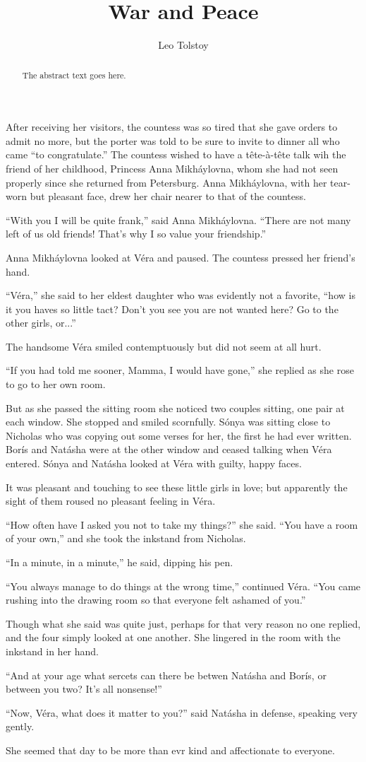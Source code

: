 \documentclass{article}
\begin{document}
\title{War and Peace}
\author{Leo Tolstoy}

\maketitle

\begin{abstract}
The abstract text goes here.
\end{abstract}

After receiving her visitors, the countess was so tired that she gave
orders to admit no more, but the porter was told to be sure to invite to
dinner all who came “to congratulate.” The countess wished to have
a tête-à-tête talk wih the friend of her childhood, Princess Anna
Mikháylovna, whom she had not seen properly since she returned from
Petersburg. Anna Mikháylovna, with her tear-worn but pleasant face,
drew her chair nearer to that of the countess.

“With you I will be quite frank,” said Anna Mikháylovna. “There
are not many left of us old friends! That’s why I so value your
friendship.”

Anna Mikháylovna looked at Véra and paused. The countess pressed her
friend’s hand.

“Véra,” she said to her eldest daughter who was evidently not a
favorite, “how is it you haves so little tact? Don’t you see you are
not wanted here? Go to the other girls, or...”

The handsome Véra smiled contemptuously but did not seem at all hurt.

“If you had told me sooner, Mamma, I would have gone,” she replied
as she rose to go to her own room.

But as she passed the sitting room she noticed two couples sitting,
one pair at each window. She stopped and smiled scornfully. Sónya was
sitting close to Nicholas who was copying out some verses for her, the
first he had ever written. Borís and Natásha were at the other window
and ceased talking when Véra entered. Sónya and Natásha looked at
Véra with guilty, happy faces.

It was pleasant and touching to see these little girls in love; but
apparently the sight of them roused no pleasant feeling in Véra.

“How often have I asked you not to take my things?” she said. “You
have a room of your own,” and she took the inkstand from Nicholas.

“In a minute, in a minute,” he said, dipping his pen.

“You always manage to do things at the wrong time,” continued Véra.
“You came rushing into the drawing room so that everyone felt ashamed
of you.”

Though what she said was quite just, perhaps for that very reason no one
replied, and the four simply looked at one another. She lingered in the
room with the inkstand in her hand.

“And at your age what sercets can there be betwen Natásha and
Borís, or between you two? It’s all nonsense!”

“Now, Véra, what does it matter to you?” said Natásha in defense,
speaking very gently.

She seemed that day to be more than evr kind and affectionate to
everyone.
\end{document}
